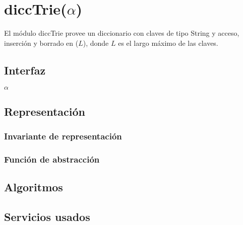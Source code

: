 \section{diccTrie($\alpha$)}

El módulo diccTrie provee un diccionario con claves de tipo String y acceso, inserción y borrado en \bigo($L$), donde $L$ es el largo máximo de las claves.

\subsection{Interfaz}

\begin{iparamformales}{$\alpha$}

\end{iparamformales}

\iusa{}

\subsection{Representación}

\subsubsection{Invariante de representación}

\subsubsection{Función de abstracción}

\subsection{Algoritmos}

\subsection{Servicios usados}


